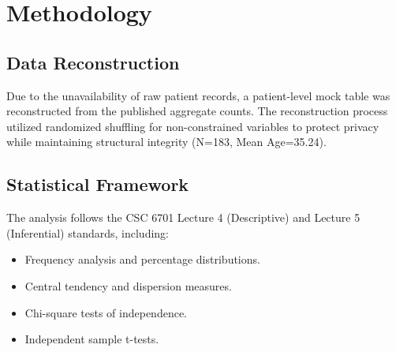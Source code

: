 \chapter{Methodology}
\section{Data Reconstruction}
Due to the unavailability of raw patient records, a patient-level mock table was reconstructed from the published aggregate counts. The reconstruction process utilized randomized shuffling for non-constrained variables to protect privacy while maintaining structural integrity (N=183, Mean Age=35.24).

\section{Statistical Framework}
The analysis follows the CSC 6701 Lecture 4 (Descriptive) and Lecture 5 (Inferential) standards, including:
\begin{itemize}
    \item Frequency analysis and percentage distributions.
    \item Central tendency and dispersion measures.
    \item Chi-square tests of independence.
    \item Independent sample t-tests.
\end{itemize}
